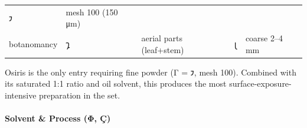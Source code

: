 \begin{longtable}[]{@{}lllll@{}}
\begin{minipage}[t]{0.17\columnwidth}
𐑲\strut
\end{minipage} & \begin{minipage}[t]{0.17\columnwidth}\raggedright
mesh 100 (150 μm)\strut
\end{minipage}\tabularnewline
\begin{minipage}[t]{0.17\columnwidth}\raggedright
botanomancy\strut
\end{minipage} & \begin{minipage}[t]{0.17\columnwidth}\raggedright
𐑡\strut
\end{minipage} & \begin{minipage}[t]{0.17\columnwidth}\raggedright
aerial parts (leaf+stem)\strut
\end{minipage} & \begin{minipage}[t]{0.17\columnwidth}\raggedright
𐑚\strut
\end{minipage} & \begin{minipage}[t]{0.17\columnwidth}\raggedright
coarse 2--4 mm\strut
\end{minipage}\tabularnewline
\bottomrule
\end{longtable}

Osiris is the only entry requiring fine powder (Γ = 𐑲, mesh 100).
Combined with its saturated 1:1 ratio and oil solvent, this produces the
most surface-exposure-intensive preparation in the set.

\hypertarget{solvent-process-ux3c6-uxe7}{%
\paragraph{Solvent \& Process (Φ, Ç)}\label{solvent-process-ux3c6-uxe7}}

